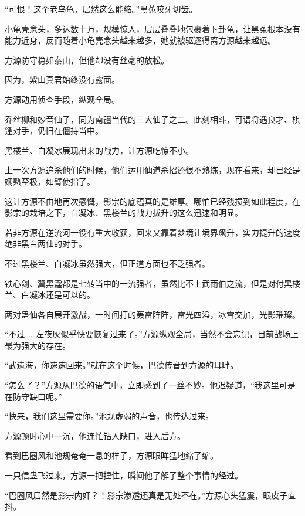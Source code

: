 
\begin{this_body}



“可恨！这个老乌龟，居然这么能缩。”黑菟咬牙切齿。

小龟壳念头，多达数十万，规模惊人，层层叠叠地包裹着卜卦龟，让黑菟根本没有能力近身，反而随着小龟壳念头越来越多，她就被驱逐得离方源越来越远。

方源防守稳如泰山，但他却没有丝毫的放松。

因为，紫山真君始终没有露面。

方源动用侦查手段，纵观全局。

乔丝柳和妙音仙子，同为南疆当代的三大仙子之二。此刻相斗，可谓将遇良才、棋逢对手，仍旧在僵持当中。

黑楼兰、白凝冰展现出来的战力，让方源吃惊不小。

上一次方源追杀他们的时候，他们运用仙道杀招还很不熟练，现在看来，却已经是娴熟至极，如臂使指了。

这让方源不由地再次感慨，影宗的底蕴真的是雄厚。哪怕已经残损到如此程度，在影宗的栽培之下，白凝冰、黑楼兰的战力拔升的这么迅速和明显。

若非方源在逆流河一役有重大收获，回来又靠着梦境让境界飙升，实力提升的速度绝非黑白两仙的对手。

不过黑楼兰、白凝冰虽然强大，但正道方面也不乏强者。

铁心剑、翼黑霆都是七转当中的一流强者，虽然比不上武雨伯之流，但是对付黑楼兰、白凝冰还是可以的。

两对蛊仙各自展开激战，一时间打的轰雷阵阵，雷光四溢，冰雪交加，光影璀璨。

“不过……左夜灰似乎快要恢复过来了。”方源纵观全局，当然不会忘记，目前战场上最为强大的存在。

“武遗海，你速速回来。”就在这个时候，巴德传音到方源的耳畔。

“怎么了？”方源从巴德的语气中，立即感到了一丝不妙。他迟疑道，“我这里可是在防守缺口呢。”

“快来，我们这里需要你。”池规虚弱的声音，也传达过来。

方源顿时心中一沉，他连忙钻入缺口，进入后方。

看到巴圈风和池规奄奄一息的样子，方源眼眸猛地缩了缩。

一只信蛊飞过来，方源一把捏住，瞬间他了解了整个事情的经过。

“巴圈风居然是影宗内奸？！影宗渗透还真是无处不在。”方源心头猛震，眼皮子直抖。


\end{this_body}
